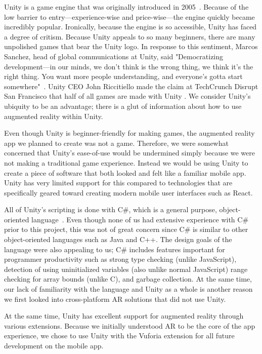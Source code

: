 \documentclass[a4paper, 10pt, american, titlepage]{article}
\begin{document}
Unity is a game engine that was originally introduced in
2005~\autocite{axon2016}. Because of the low barrier to entry---experience-wise
and price-wise---the engine quickly became incredibly popular. Ironically,
because the engine is so accessible, Unity has faced a degree of critism.
Because Unity appeals to so many beginners, there are many unpolished games that
bear the Unity logo. In response to this sentiment, Marcos Sanchez, head of
global communications at Unity, said "Democratizing development---in our minds,
we don't think is the wrong thing, we think it's the right thing. You want more
people understanding, and everyone’s gotta start somewhere"~\autocite{axon2016}.
Unity CEO John Riccitiello made the claim at TechCrunch Disrupt San Francisco
that half of all games are made with Unity \autocite{dillet2018}. We consider
Unity's ubiquity to be an advantage; there is a glut of information about how to
use augmented reality within Unity.

Even though Unity is beginner-friendly for making games, the augmented reality
app we planned to create was not a game. Therefore, we were somewhat concerned
that Unity's ease-of-use would be undermined simply because we were not making a
traditional game experience. Instead we would be using Unity to create a piece
of software that both looked and felt like a familiar mobile app. Unity has very
limited support for this compared to technologies that are specifically geared
toward creating modern mobile user interfaces such as React.

All of Unity's scripting is done with C\#, which is a general purpose,
object-oriented language~\autocite{ecmainternational2017}. Even though none of
us had extensive experience with C\# prior to this project, this was not of
great concern since C\# is similar to other object-oriented languages such as
Java and C++. The design goals of the language were also appealing to us; C\#
includes features important for programmer productivity such as strong type
checking (unlike JavaScript), detection of using uninitialized variables (also
unlike normal JavaScript) range checking for array bounds (unlike C), and
garbage collection. At the same time, our lack of familiarity with the language
and Unity as a whole is another reason we first looked into cross-platform AR
solutions that did not use Unity.

At the same time, Unity has excellent support for augmented reality through
various extensions. Because we initially understood AR to be the core of the app
experience, we chose to use Unity with the Vuforia extension for all future
development on the mobile app.
\end{document}
